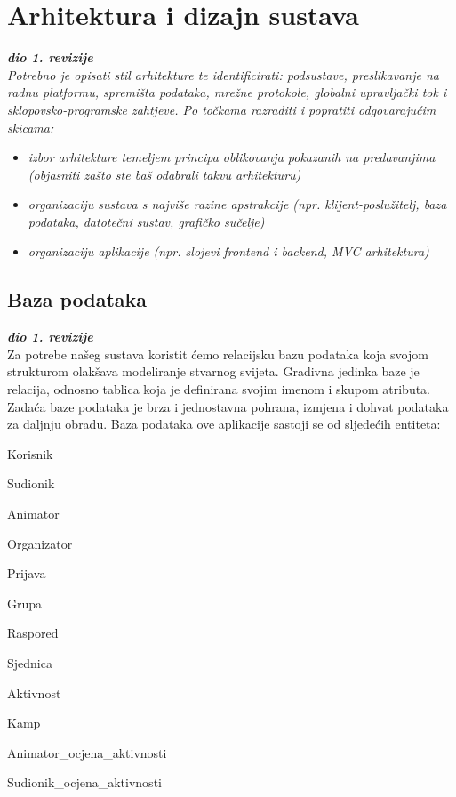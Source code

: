 \chapter{Arhitektura i dizajn sustava}
		
		\textbf{\textit{dio 1. revizije}}\\

		\textit{ Potrebno je opisati stil arhitekture te identificirati: podsustave, preslikavanje na radnu platformu, spremišta podataka, mrežne protokole, globalni upravljački tok i sklopovsko-programske zahtjeve. Po točkama razraditi i popratiti odgovarajućim skicama:}
	\begin{itemize}
		\item 	\textit{izbor arhitekture temeljem principa oblikovanja pokazanih na predavanjima (objasniti zašto ste baš odabrali takvu arhitekturu)}
		\item 	\textit{organizaciju sustava s najviše razine apstrakcije (npr. klijent-poslužitelj, baza podataka, datotečni sustav, grafičko sučelje)}
		\item 	\textit{organizaciju aplikacije (npr. slojevi frontend i backend, MVC arhitektura) }		
	\end{itemize}

	
		

		

				
		\section{Baza podataka}
			
			\textbf{\textit{dio 1. revizije}}\\
			
		Za potrebe našeg sustava koristit ćemo relacijsku bazu podataka koja svojom strukturom olakšava modeliranje stvarnog svijeta. Gradivna jedinka baze je relacija, odnosno tablica koja je definirana svojim imenom i skupom atributa. Zadaća baze podataka je brza i jednostavna pohrana, izmjena i dohvat podataka za daljnju obradu. Baza podataka ove aplikacije sastoji se od sljedećih entiteta:
		\begin{packed_item}
			\item Korisnik
			\item Sudionik
			\item Animator
			\item Organizator
			\item Prijava
			\item Grupa
			\item Raspored
			\item Sjednica
			\item Aktivnost
			\item Kamp
			\item Animator\_ocjena\_aktivnosti
			\item Sudionik\_ocjena\_aktivnosti
		\end{packed_item}
